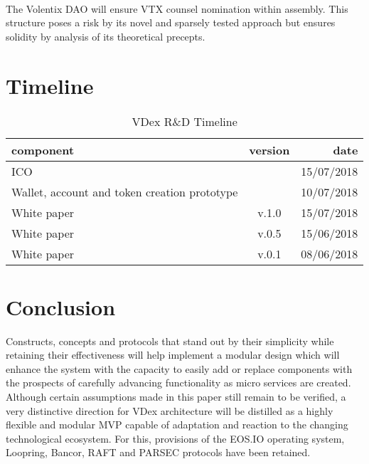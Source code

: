 \documentclass[]{article}
\begin{document}
	\paragraph{}  The Volentix DAO will ensure VTX counsel nomination within assembly. This structure poses a risk by its novel and sparsely tested approach but ensures solidity by analysis of its theoretical precepts.
\paragraph{}
\paragraph{}	
\section{Timeline}
	
\begin{table}[h!]
	\begin{center}
		\caption{VDex R\&D Timeline}
		\label{tab:table1}
		\begin{tabular}{l|c|r}
			
			\textbf{component} & \textbf{version}&  \textbf{date}  \\
			\hline
			ICO   &  & 15/07/2018\\
			\hline
			Wallet, account and token creation prototype  &  & 10/07/2018\\
			\hline
			White paper  & v.1.0  & 15/07/2018\\
			\hline
			White paper  & v.0.5 & 15/06/2018\\
			\hline			
			White paper  & v.0.1 & 08/06/2018\\
			\hline
			
			
			
		\end{tabular}
	\end{center}
\end{table}
		
\section{Conclusion}
Constructs, concepts and protocols that stand out by their simplicity
while retaining their effectiveness will help implement a modular
design which will enhance the system with the capacity to easily add or replace components with the prospects of carefully advancing functionality as micro services are created.
Although certain assumptions made in this paper still remain to be verified,
a very distinctive direction for VDex architecture will be distilled as a highly flexible and modular MVP capable of adaptation and reaction to the changing technological ecosystem.
For this, provisions of the EOS.IO operating system, Loopring, Bancor, RAFT and PARSEC protocols have been retained. 
\end{document}
